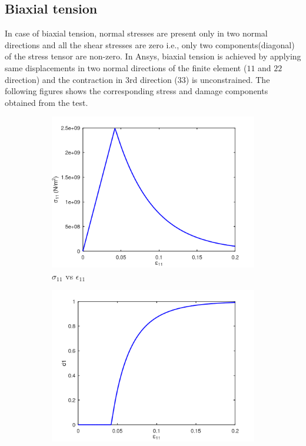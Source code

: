 \documentclass[a4paper,12pt]{extarticle}
\begin{document}
\subsection{Biaxial tension}
\indent\indent\indent  In case of biaxial tension, normal stresses are present only in two normal directions and all the shear stresses are zero  i.e., only two components(diagonal) of the stress tensor are non-zero. In Ansys, biaxial tension is achieved by applying same displacements in two normal directions of the finite element ($11$ and $22$ direction) and the contraction in 3rd direction ($33$) is unconstrained. The following figures shows the corresponding stress and damage components obtained from the test.
\begin{figure}[htbp]
     \centering
     \captionsetup[subfigure]{justification=centering}
     \begin{subfigure}{0.45\textwidth}
         \centering
         \includegraphics[width=1.25\textwidth]{23.S11vsE11.png}
         \caption{$\sigma_{11}$ vs $\epsilon_{11}$}
         \label{fig:S11vsE11}
     \end{subfigure}
	\hfill
     \captionsetup[subfigure]{justification=centering}
     \begin{subfigure}{0.45\textwidth}
         \centering
         \includegraphics[width=1.25\textwidth]{23.d1.png}

\end{subfigure}
\end{figure}
\end{document}
